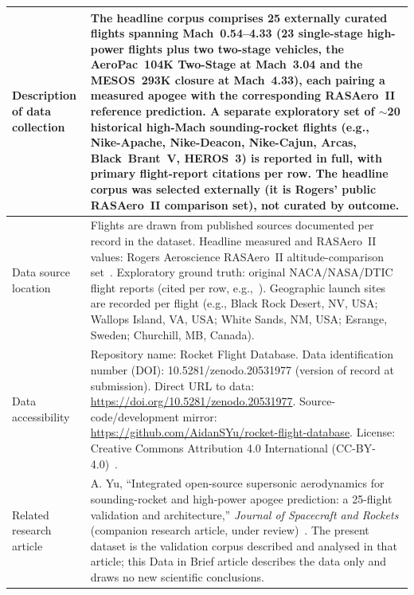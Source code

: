 \begin{longtable}{@{}>{\raggedright\arraybackslash}p{}p{}@{}}
Description of data collection &
The headline corpus comprises 25 externally curated flights spanning Mach~0.54--4.33
(23 single-stage high-power flights plus two two-stage vehicles, the AeroPac~104K Two-Stage
at Mach~3.04 and the MESOS~293K closure at Mach~4.33), each pairing a
measured apogee with the corresponding RASAero~II reference prediction. A separate
exploratory set of $\sim$20 historical high-Mach sounding-rocket flights (e.g., Nike-Apache,
Nike-Deacon, Nike-Cajun, Arcas, Black~Brant~V, HEROS~3) is reported in full, with primary
flight-report citations per row. The headline corpus was selected externally (it is Rogers'
public RASAero~II comparison set), not curated by outcome. \\
\midrule
Data source location &
Flights are drawn from published sources documented per record in the dataset. Headline
measured and RASAero~II values: Rogers Aeroscience RASAero~II altitude-comparison
set~\cite{rogers_rasaero_alt}. Exploratory ground truth: original NACA/NASA/DTIC flight
reports (cited per row, e.g.,~\cite{heitkotter1956,nasa_x721_66_568,dtic_ad0733141}).
Geographic launch sites are recorded per flight (e.g., Black Rock Desert, NV, USA;
Wallops Island, VA, USA; White Sands, NM, USA; Esrange, Sweden; Churchill, MB, Canada). \\
\midrule
Data accessibility &
Repository name: Rocket Flight Database. \newline
Data identification number (DOI): 10.5281/zenodo.20531977 (version of record at submission). \newline
Direct URL to data: \url{https://doi.org/10.5281/zenodo.20531977}. \newline
Source-code/development mirror: \url{https://github.com/AidanSYu/rocket-flight-database}. \newline
License: Creative Commons Attribution 4.0 International (CC-BY-4.0)~\cite{rfd_zenodo}. \\
\midrule
Related research article &
A. Yu, ``Integrated open-source supersonic aerodynamics for sounding-rocket and high-power
apogee prediction: a 25-flight validation and architecture,'' \textit{Journal of Spacecraft
and Rockets} (companion research article, under review)~\cite{yu2026jsr}. The present dataset is the
validation corpus described and analysed in that article; this Data in Brief article describes
the data only and draws no new scientific conclusions. \\
\bottomrule
\end{longtable}
\endgroup
